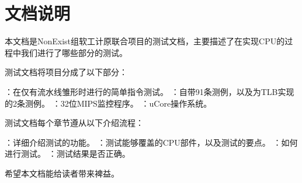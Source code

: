 \chapter{文档说明}

本文档是NonExist组软工计原联合项目的测试文档，主要描述了在实现CPU的过程中我们进行了哪些部分的测试。

测试文档将项目分成了以下部分：

    \begin{enumerate}
        ：在仅有流水线雏形时进行的简单指令测试。
        ：自带91条测例，以及为TLB实现的2条测例。
        ：32位MIPS监控程序。
        ：uCore操作系统。
    \end{enumerate}


测试文档每个章节遵从以下介绍流程：

    \begin{enumerate}
        ：详细介绍测试的功能。
        ：测试能够覆盖的CPU部件，以及测试的要点。
        ：如何进行测试。
        ：测试结果是否正确。
    \end{enumerate}

希望本文档能给读者带来裨益。
